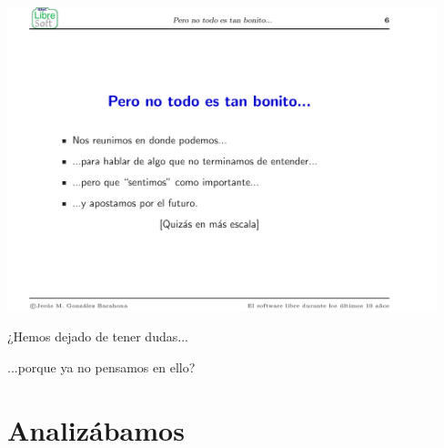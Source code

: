 \documentclass[17pt,aspectratio=169]{beamer}
\begin{document}
\begin{frame}

\begin{center}
  \includegraphics[width=12.5cm]{figs/transpas-07}
\end{center}  

\end{frame}

\begin{frame}

  \begin{center}
    {\large
      ¿Hemos dejado de tener dudas...
      
      \vspace{1cm}
      
      ...porque ya no pensamos en ello? \\
    }
  \end{center}
  
\end{frame}

\section{Analizábamos}
\end{document}
